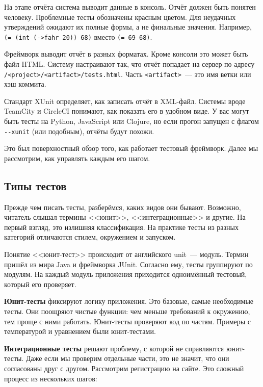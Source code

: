 На этапе отчёта система выводит данные в консоль. Отчёт должен быть понятен
человеку. Проблемные тесты обозначены красным цветом. Для неудачных утверждений
ожидают их полные формы, а не финальные значения. Например,
\verb|(= (int (->fahr 20)) 68)| вместо \verb|(= 69 68)|.

Фреймворк выводит отчёт в разных форматах. Кроме консоли это может быть файл
HTML. Систему настраивают так, что отчёт попадает на сервер по адресу
\texttt{/<project>/<arti\-fact>/tests.html}. Часть \verb|<artifact>|~--- это имя
ветки или хэш коммита.

Стандарт XUnit определяет, как записать отчёт в XML-файл. Системы вроде TeamCity
и CircleCI понимают, как показать его в удобном виде. У вас могут быть тесты на
Python, JavaScript или Clojure, но если прогон запущен с флагом \verb|--xunit|
(или подобным), отчёты будут похожи.

Это был поверхностный обзор того, как работает тестовый фреймворк. Далее мы
рассмотрим, как управлять каждым его шагом.

\subsection{Типы тестов}


Прежде чем писать тесты, разберёмся, каких видов они бывают. Возможно, читатель
слышал термины <<юнит>>, <<интеграционные>> и другие. На первый взгляд, это
излишняя классификация. На практике тесты из разных категорий отличаются стилем,
окружением и запуском.

Понятие <<юнит-тест>> происходит от английского unit~--- модуль. Термин пришёл
из мира Java и фреймворка JUnit. Согласно ему, тесты группируют по модулям. На
каждый модуль приложения приходится одноимённый тестовый, который его проверяет.

\textbf{Юнит-тесты} фиксируют логику приложения. Это базовые, самые необходимые
тесты. Они поощряют чистые функции: чем меньше требований к окружению, тем проще
с ними работать. Юнит-тесты проверяют код по частям. Примеры с температурой и
уравнением были юнит-тестами.


\textbf{Интеграционные тесты} решают проблему, с которой не справляются
юнит-тесты. Даже если мы проверим отдельные части, это не значит, что они
согласованы друг с другом. Рассмотрим регистрацию на сайте. Это сложный процесс
из нескольких шагов:

